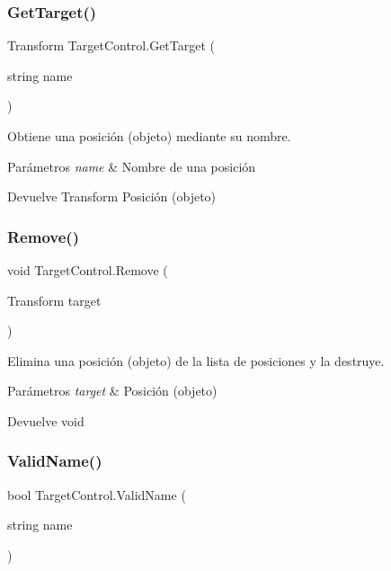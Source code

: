 \subsubsection{\texorpdfstring{GetTarget()}{GetTarget()}\hspace{0.1cm}{\footnotesize\ttfamily [2/2]}}
{\footnotesize\ttfamily Transform Target\+Control.\+Get\+Target (\begin{DoxyParamCaption}\item[{string}]{name }\end{DoxyParamCaption})\hspace{0.3cm}{\ttfamily [inline]}}

Obtiene una posición (objeto) mediante su nombre. 
\begin{DoxyParams}{Parámetros}
{\em name} & Nombre de una posición \\
\hline
\end{DoxyParams}
\begin{DoxyReturn}{Devuelve}
Transform Posición (objeto) 
\end{DoxyReturn}
\mbox{\label{class_target_control_a118416e825413adb6c4c60ac7b08ff69}} 
\subsubsection{\texorpdfstring{Remove()}{Remove()}}
{\footnotesize\ttfamily void Target\+Control.\+Remove (\begin{DoxyParamCaption}\item[{Transform}]{target }\end{DoxyParamCaption})\hspace{0.3cm}{\ttfamily [inline]}}

Elimina una posición (objeto) de la lista de posiciones y la destruye. 
\begin{DoxyParams}{Parámetros}
{\em target} & Posición (objeto) \\
\hline
\end{DoxyParams}
\begin{DoxyReturn}{Devuelve}
void 
\end{DoxyReturn}
\mbox{\label{class_target_control_a6fc8e97f10a1270357d483e629c0a899}} 
\subsubsection{\texorpdfstring{ValidName()}{ValidName()}}
{\footnotesize\ttfamily bool Target\+Control.\+Valid\+Name (\begin{DoxyParamCaption}\item[{string}]{name }\end{DoxyParamCaption})\hspace{0.3cm}{\ttfamily [inline]}}

